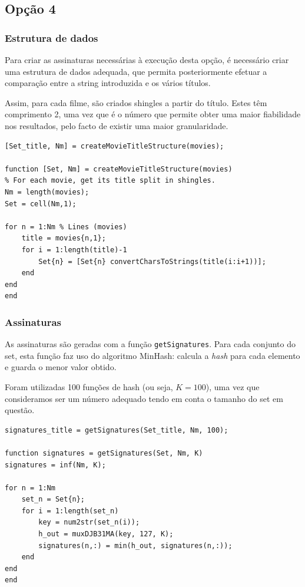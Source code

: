 \documentclass[portuguese, 11pt, a4paper,titlepage, oneside]{article}
\begin{document}
\subsection{Opção 4}
\subsubsection{Estrutura de dados} \label{4_structure}
Para criar as assinaturas necessárias à execução desta opção, é necessário criar uma estrutura de dados adequada, que permita posteriormente efetuar a comparação entre a string introduzida e os vários títulos.

Assim, para cada filme, são criados shingles a partir do título. Estes têm comprimento 2, uma vez que é o número que permite obter uma maior fiabilidade nos resultados, pelo facto de existir uma maior granularidade.

\begin{lstlisting}[style=Matlab-editor]
[Set_title, Nm] = createMovieTitleStructure(movies);

function [Set, Nm] = createMovieTitleStructure(movies)
% For each movie, get its title split in shingles.
Nm = length(movies);
Set = cell(Nm,1);

for n = 1:Nm % Lines (movies)
    title = movies{n,1};
    for i = 1:length(title)-1
        Set{n} = [Set{n} convertCharsToStrings(title(i:i+1))];
    end
end
end
\end{lstlisting}

\subsubsection{Assinaturas} \label{4_signatures}
As assinaturas são geradas com a função \verb|getSignatures|. Para cada conjunto do set, esta função faz uso do algoritmo MinHash: calcula a \textit{hash} para cada elemento e guarda o menor valor obtido.

Foram utilizadas 100 funções de hash (ou seja, \(K = 100\)), uma vez que consideramos ser um número adequado tendo em conta o tamanho do set em questão.
\begin{lstlisting}[style=Matlab-editor]
signatures_title = getSignatures(Set_title, Nm, 100);

function signatures = getSignatures(Set, Nm, K)
signatures = inf(Nm, K);

for n = 1:Nm
    set_n = Set{n};
    for i = 1:length(set_n)
        key = num2str(set_n(i));
        h_out = muxDJB31MA(key, 127, K);
        signatures(n,:) = min(h_out, signatures(n,:));
    end
end
end
\end{lstlisting}
\end{document}
